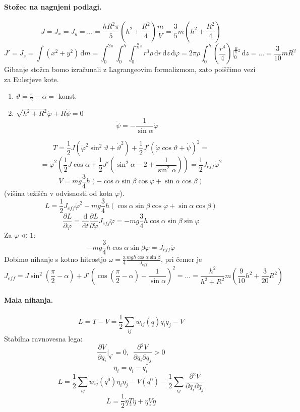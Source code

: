 \documentclass[a4paper]{article}
\newcommand{\dif}{\,\mathrm{d}}
\newcommand{\pd}[2]{\frac{\partial {#1}}{\partial {#2}}}
\newcommand{\dd}[2]{\frac{\mathrm{d} {#1}}{\mathrm{d} {#2}}}
\newcommand{\duline}[1]{\underline{\underline{#1}}}
\begin{document}
\paragraph{Stožec na nagnjeni podlagi.}
$$J = J_x = J_y =... =  \frac{hR^2\pi}{5}\left(h^2 + \frac{R^2}{4}\right)\frac{m}{V} = \frac{3}{5}m\left(h^2 + \frac{R^2}{4}\right)$$
$$J' = J_z = \int (x^2 + y^2)\dif m = \int_{0}^{2\pi} \int_{0}^{h} \int_{0}^{\frac{R}{h}z} r^3 \rho \dif r \dif z \dif \varphi =
2\pi\rho \int_{0}^{h} \left(\frac{r^4}{4}\right)\Big|_0^{\frac{R}{h}z}\dif z = ... = \frac{3}{10}mR^2$$
Gibanje stožca bomo izračunali z Lagrangeovim formalizmom, zato poiščimo vezi za Eulerjeve kote.
\begin{enumerate}
    \item $\vartheta = \frac{\pi}{2} - \alpha = $ konst.
    \item $\sqrt{h^2 + R^2}\dot\varphi + R\dot\psi = 0$
    $$\dot\psi = -\frac{1}{\sin\alpha}\dot\varphi$$
\end{enumerate}
$$T = \frac{1}{2}J\left(\dot\varphi^2\sin^2\vartheta + \dot\vartheta^2\right) + \frac{1}{2}J' \left(\dot\varphi\cos\vartheta + \dot\psi\right)^2 =$$
$$ = \dot\varphi^2 \left(\frac{1}{2}J\cos\alpha + \frac{1}{2}J'\left(\sin^2\alpha - 2 + \frac{1}{\sin^2\alpha}\right)\right) = \frac{1}{2}J_{eff}\dot\varphi^2$$
$$V = mg\frac{3}{4}h(-\cos\alpha\sin\beta\cos\varphi + \sin\alpha\cos\beta)$$
(višina težišča v odvisnosti od kota $\varphi$).
$$L = \frac{1}{2}J_{eff}\dot\varphi^2 - mg\frac{3}{4}h\left(\cos\alpha\sin\beta\cos\varphi + \sin\alpha\cos\beta\right)$$
$$\pd{L}{\varphi} = \dd{}{t}\pd{L}{\dot\varphi}J_{eff}\ddot\varphi = -mg\frac{3}{4}h\cos\alpha\sin\beta\sin\varphi$$
Za $\varphi \ll 1$:
$$-mg\frac{3}{4}h \cos\alpha\sin\beta \varphi = J_{eff}\ddot\varphi$$
Dobimo nihanje s kotno hitrostjo $\displaystyle{\omega = \frac{3}{4}\frac{mgh\cos\alpha\sin\beta}{J_{eff}}}$, pri čemer je
$$J_{eff} = J\sin^2\left(\frac{\pi}{2} - \alpha\right) + J'\left(\cos\left(\frac{\pi}{2}-\alpha\right) - \frac{1}{\sin\alpha}\right)^2 = ... = \frac{h^2}{h^2 + R^2}m\left(\frac{9}{10}h^2 + \frac{3}{20}R^2\right)$$
\paragraph{Mala nihanja.} $$L = T - V = \frac{1}{2} \sum_{ij} w_{ij}(\underline{q})q_iq_j - V$$
Stabilna ravnovesna lega: $$\pd{V}{q_i} \Big|_{\underline{q}^*} = 0,~~\pd{^2V}{q_i \partial q_j} > 0$$
$$\eta_i = q_i - q_i^*$$
$$L = \frac{1}{2}\sum_{ij} w_{ij}(\underline{q}^0) \dot{\eta}_i\dot{\eta}_j - V(\underline{q}^0) - \frac{1}{2}\sum_{ij} \pd{^2V}{q_i \partial q_j}$$
$$L = \frac{1}{2}\underline{\dot\eta} \duline{T} \underline{\dot\eta} + \underline{\eta} \duline{V} \underline{\eta}$$
\newpage
\end{document}
